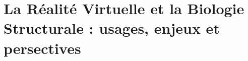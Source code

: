 
\chapter[La Réalité Virtuelle et la Biologie Structurale : usages, enjeux et persectives]{La Réalité Virtuelle et la Biologie Structurale : usages, enjeux et persectives}
\label{Sec:RV}
\minitoc
\cleardoublepage







